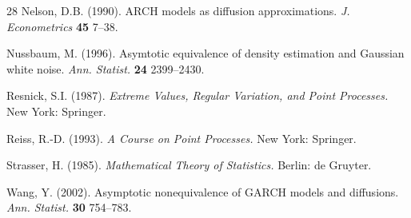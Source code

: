 \documentclass[number,citesort,seceqn,dvips]{arxbj}
\begin{document}
\begin{thebibliography}{28}
Nelson, D.B. (1990). ARCH models as diffusion
approximations. \textit{J. Econometrics} \textbf{45} 7--38.

Nussbaum, M. (1996). Asymtotic equivalence of density
estimation and Gaussian white noise. \textit{Ann. Statist.} \textbf{24}
2399--2430.

Resnick, S.I. (1987). \textit{Extreme Values, Regular Variation, and
Point Processes.} New York: Springer.

Reiss, R.-D. (1993). \textit{A Course on Point Processes.}
New York: Springer.

Strasser, H. (1985). \textit{Mathematical Theory of Statistics.}
Berlin: de Gruyter.

Wang, Y. (2002). Asymptotic nonequivalence of GARCH models
and diffusions. \textit{Ann. Statist.} \textbf{30} 754--783.

\end{thebibliography}

\printhistory
\end{document}
